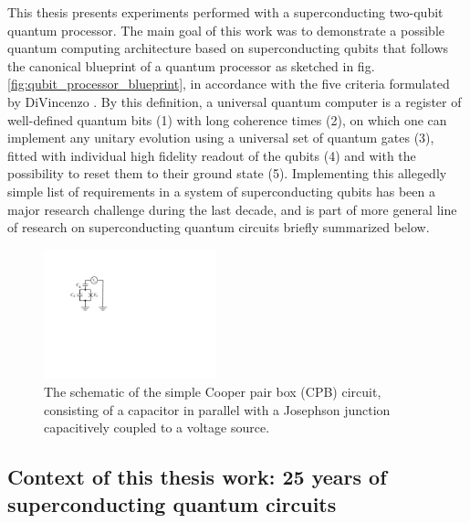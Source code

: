 This thesis presents experiments performed with a superconducting
two-qubit quantum processor. The main goal of this work was to demonstrate
a possible quantum computing architecture based on superconducting
qubits that follows the canonical blueprint of a quantum processor
as sketched in fig. \ref{fig:qubit_processor_blueprint},
in accordance with the five criteria formulated by DiVincenzo \citep{divincenzo_physical_2000}.
By this definition, a universal quantum computer is a register of
well-defined quantum bits (1) with long coherence times (2),
on which one can implement any unitary evolution using a universal
set of quantum gates (3), fitted with individual high fidelity readout
of the qubits (4) and with the possibility to reset them to their ground state (5). Implementing this allegedly simple list of requirements
in a system of superconducting qubits has been a major research challenge
during the last decade, and is part of more general line of research
on superconducting quantum circuits briefly summarized below.

%
\begin{figure}
 \centering \includegraphics[width=5cm]{./material/figures/introduction/cooper_pair_box_simple}
\caption[]{The schematic of the simple Cooper pair box (CPB) circuit, consisting
of a capacitor in parallel with a Josephson junction capacitively
coupled to a voltage source.}
\label{fig:cooper_pair_box_simple} %
\end{figure}



\subsection{Context of this thesis work: 25 years of superconducting
quantum circuits}

